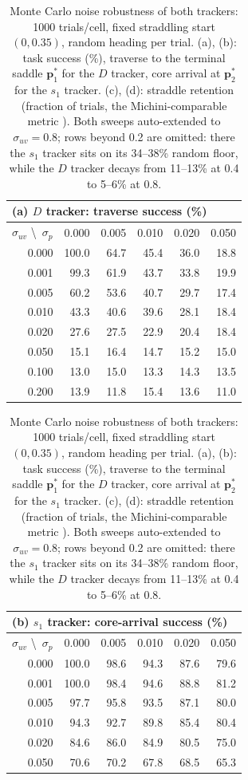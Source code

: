 \documentclass[lettersize,journal]{IEEEtran}
\begin{document}
\begin{table}[!t]
\centering
\caption{Monte Carlo noise robustness of both trackers: 1000
trials/cell, fixed straddling start $(0, 0.35)$, random heading per
trial. (a), (b): task success (\%), traverse to the terminal saddle
$\mathbf{p}^*_1$ for the $D$ tracker, core arrival at
$\mathbf{p}^*_2$ for the $s_1$ tracker. (c), (d): straddle retention
(fraction of trials, the Michini-comparable metric \cite{9}). Both
sweeps auto-extended to $\sigma_{uv} = 0.8$; rows beyond 0.2 are
omitted: there the $s_1$ tracker sits on its 34--38\% random floor,
while the $D$ tracker decays from 11--13\% at 0.4 to 5--6\% at 0.8.}
\label{tab:mc_success}
\footnotesize
\setlength{\tabcolsep}{4pt}
\begin{tabular}{r|rrrrr}
\multicolumn{6}{l}{(a) $D$ tracker: traverse success (\%)} \\
\hline
$\sigma_{uv}$ \textbackslash\ $\sigma_p$ & 0.000 & 0.005 & 0.010 & 0.020 & 0.050 \\
\hline
0.000 & 100.0 & 64.7 & 45.4 & 36.0 & 18.8 \\
0.001 &  99.3 & 61.9 & 43.7 & 33.8 & 19.9 \\
0.005 &  60.2 & 53.6 & 40.7 & 29.7 & 17.4 \\
0.010 &  43.3 & 40.6 & 39.6 & 28.1 & 18.4 \\
0.020 &  27.6 & 27.5 & 22.9 & 20.4 & 18.4 \\
0.050 &  15.1 & 16.4 & 14.7 & 15.2 & 15.0 \\
0.100 &  13.0 & 15.0 & 13.3 & 14.3 & 13.5 \\
0.200 &  13.9 & 11.8 & 15.4 & 13.6 & 11.0 \\
\hline
\end{tabular}
\hspace{1.5em}
\begin{tabular}{r|rrrrr}
\multicolumn{6}{l}{(b) $s_1$ tracker: core-arrival success (\%)} \\
\hline
$\sigma_{uv}$ \textbackslash\ $\sigma_p$ & 0.000 & 0.005 & 0.010 & 0.020 & 0.050 \\
\hline
0.000 & 100.0 & 98.6 & 94.3 & 87.6 & 79.6 \\
0.001 & 100.0 & 98.4 & 94.6 & 88.8 & 81.2 \\
0.005 &  97.7 & 95.8 & 93.5 & 87.1 & 80.0 \\
0.010 &  94.3 & 92.7 & 89.8 & 85.4 & 80.4 \\
0.020 &  84.6 & 86.0 & 84.9 & 80.5 & 75.0 \\
0.050 &  70.6 & 70.2 & 67.8 & 68.5 & 65.3 \\

\end{tabular}
\end{table}
\end{document}
